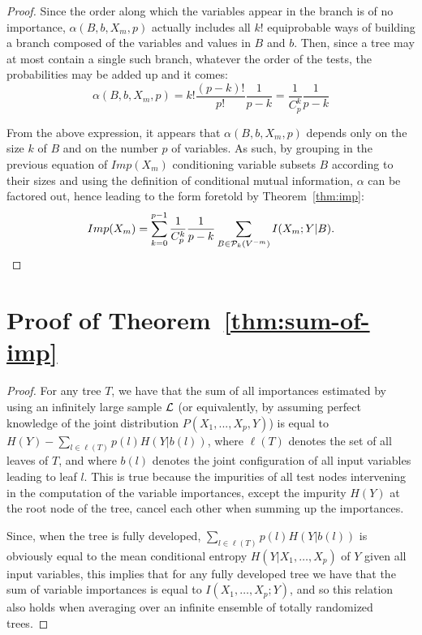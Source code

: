 \documentclass{article}
\begin{document}
\begin{proof}
Since the order along which the variables appear in the branch is of no
importance, $\alpha(B,b,X_m,p)$ actually includes all $k!$ equiprobable ways of
building a branch composed of the variables and values in $B$ and $b$. Then,
since a tree may at most contain a single such branch, whatever the order of the
tests, the probabilities may be added up and it comes:
\begin{equation*}
\alpha(B,b,X_m,p)=k! \frac{(p-k)!}{p!} \frac{1}{p-k} = \frac{1}{C_p^k} \frac{1}{p-k}
\end{equation*}

From the above expression, it appears that $\alpha(B,b,X_m,p)$ depends only on
the size $k$ of $B$ and on the number $p$ of variables. As such, by grouping in
the previous equation of $Imp(X_m)$ conditioning variable subsets $B$ according
to their sizes and using the definition of conditional mutual information,
$\alpha$ can be factored out, hence leading to the form foretold by Theorem~\ref{thm:imp}:
\begin{equation*}
Imp(X_m)=\sum_{k=0}^{p-1} \frac{1}{C^k_p} \frac{1}{p-k} \sum_{B \in {\cal P}_k(V^{-m})} I(X_m;Y|B).
\end{equation*}
\end{proof}





\section{Proof of Theorem~\ref{thm:sum-of-imp}}
\label{app:thm:sum-of-imp}

\begin{proof}
For any tree $T$, we have that the sum of all
importances estimated by using an infinitely large sample $\cal L$ (or
equivalently, by assuming perfect knowledge of the joint distribution $P(X_1,
..., X_p, Y)$) is equal to $H(Y) - \sum_{l \in \ell(T)} p(l) H(Y|b(l))$, where
$\ell(T)$ denotes the set of all leaves of $T$, and where $b(l)$  denotes the
joint configuration of all input variables leading to leaf $l$. This is true because the impurities of all test nodes intervening in the computation of the variable importances, except the impurity $H(Y)$ at the root node of the tree, cancel each other when summing up the importances.

Since, when the tree is fully developed,
$\sum_{l \in \ell(T)} p(l) H(Y|b(l))$ is obviously equal to the mean conditional entropy
$H(Y | X_{1}, \ldots, X_{p})$ of $Y$ given all input variables, this implies
that for any fully developed tree we have that the sum of variable importances
is equal to $I(X_{1}, \ldots, X_{p} ; Y)$, and so this relation also holds when
averaging over an infinite ensemble of totally randomized trees.
\end{proof}
\end{document}

